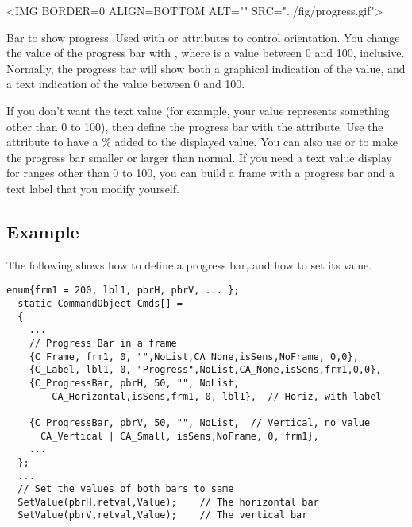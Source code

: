 
\small
\begin{rawhtml}
<IMG BORDER=0 ALIGN=BOTTOM ALT="" SRC="../fig/progress.gif">
\end{rawhtml}
\begin{latexonly}

\end{latexonly}
\normalfont\normalsize
\vspace{.1in}

Bar to show progress. Used with 
or  attributes to control orientation.
You change the value of the progress bar with
, where  is
a value between 0 and 100, inclusive. Normally, the
progress bar will show both a graphical indication of the value,
and a text indication of the value between 0 and 100.

If you don't want the text value (for example, your value
represents something other than 0 to 100), then define the
progress bar with the  attribute. Use
the  attribute to have a \% added to the
displayed value. You can also use  or 
to make the progress bar smaller or larger than normal. If you
need a text value display for ranges other than 0 to 100, you can
build a  frame with a progress bar and a text
label that you modify yourself.

\subsection* {Example}

The following shows how to define a progress bar, and how to
set its value.

\footnotesize
\begin{verbatim}
enum{frm1 = 200, lbl1, pbrH, pbrV, ... };
  static CommandObject Cmds[] =
  {
    ...
    // Progress Bar in a frame
    {C_Frame, frm1, 0, "",NoList,CA_None,isSens,NoFrame, 0,0},
    {C_Label, lbl1, 0, "Progress",NoList,CA_None,isSens,frm1,0,0},
    {C_ProgressBar, pbrH, 50, "", NoList,
        CA_Horizontal,isSens,frm1, 0, lbl1},  // Horiz, with label

    {C_ProgressBar, pbrV, 50, "", NoList,  // Vertical, no value
      CA_Vertical | CA_Small, isSens,NoFrame, 0, frm1},
    ...
  };
  ...
  // Set the values of both bars to same
  SetValue(pbrH,retval,Value);    // The horizontal bar
  SetValue(pbrV,retval,Value);    // The vertical bar

\end{verbatim}
\normalfont\normalsize

